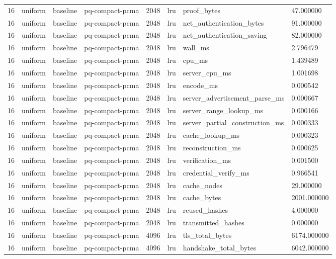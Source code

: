 \begin{tabular}{llllllll}
16 & uniform & baseline & pq-compact-pcma & 2048 & lru & proof\_bytes & 47.000000 \\
16 & uniform & baseline & pq-compact-pcma & 2048 & lru & net\_authentication\_bytes & 91.000000 \\
16 & uniform & baseline & pq-compact-pcma & 2048 & lru & net\_authentication\_saving & 82.000000 \\
16 & uniform & baseline & pq-compact-pcma & 2048 & lru & wall\_ms & 2.796479 \\
16 & uniform & baseline & pq-compact-pcma & 2048 & lru & cpu\_ms & 1.439489 \\
16 & uniform & baseline & pq-compact-pcma & 2048 & lru & server\_cpu\_ms & 1.001698 \\
16 & uniform & baseline & pq-compact-pcma & 2048 & lru & encode\_ms & 0.000542 \\
16 & uniform & baseline & pq-compact-pcma & 2048 & lru & server\_advertisement\_parse\_ms & 0.000667 \\
16 & uniform & baseline & pq-compact-pcma & 2048 & lru & server\_range\_lookup\_ms & 0.000166 \\
16 & uniform & baseline & pq-compact-pcma & 2048 & lru & server\_partial\_construction\_ms & 0.000333 \\
16 & uniform & baseline & pq-compact-pcma & 2048 & lru & cache\_lookup\_ms & 0.000323 \\
16 & uniform & baseline & pq-compact-pcma & 2048 & lru & reconstruction\_ms & 0.000625 \\
16 & uniform & baseline & pq-compact-pcma & 2048 & lru & verification\_ms & 0.001500 \\
16 & uniform & baseline & pq-compact-pcma & 2048 & lru & credential\_verify\_ms & 0.966541 \\
16 & uniform & baseline & pq-compact-pcma & 2048 & lru & cache\_nodes & 29.000000 \\
16 & uniform & baseline & pq-compact-pcma & 2048 & lru & cache\_bytes & 2001.000000 \\
16 & uniform & baseline & pq-compact-pcma & 2048 & lru & reused\_hashes & 4.000000 \\
16 & uniform & baseline & pq-compact-pcma & 2048 & lru & transmitted\_hashes & 0.000000 \\
16 & uniform & baseline & pq-compact-pcma & 4096 & lru & tls\_total\_bytes & 6174.000000 \\
16 & uniform & baseline & pq-compact-pcma & 4096 & lru & handshake\_total\_bytes & 6042.000000 \\

\end{tabular}
